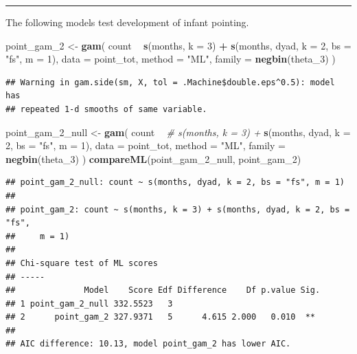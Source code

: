 \documentclass[]{article}
\newenvironment{Shaded}{\begin{snugshade}}{\end{snugshade}}
\newcommand{\CommentTok}[1]{\textcolor[rgb]{0.56,0.35,0.01}{\textit{#1}}}
\newcommand{\DataTypeTok}[1]{\textcolor[rgb]{0.13,0.29,0.53}{#1}}
\newcommand{\DecValTok}[1]{\textcolor[rgb]{0.00,0.00,0.81}{#1}}
\newcommand{\KeywordTok}[1]{\textcolor[rgb]{0.13,0.29,0.53}{\textbf{#1}}}
\newcommand{\NormalTok}[1]{#1}
\newcommand{\OperatorTok}[1]{\textcolor[rgb]{0.81,0.36,0.00}{\textbf{#1}}}
\newcommand{\StringTok}[1]{\textcolor[rgb]{0.31,0.60,0.02}{#1}}
\begin{document}
\begin{center}\rule{0.5\linewidth}{\linethickness}\end{center}

The following models test development of infant pointing.

\begin{Shaded}
\begin{Highlighting}[]
\NormalTok{point_gam_}\DecValTok{2}\NormalTok{ <-}\StringTok{ }\KeywordTok{gam}\NormalTok{(}
\NormalTok{  count }\OperatorTok{~}
\StringTok{    }\KeywordTok{s}\NormalTok{(months, }\DataTypeTok{k =} \DecValTok{3}\NormalTok{) }\OperatorTok{+}
\StringTok{    }\KeywordTok{s}\NormalTok{(months, dyad, }\DataTypeTok{k =} \DecValTok{2}\NormalTok{, }\DataTypeTok{bs =} \StringTok{"fs"}\NormalTok{, }\DataTypeTok{m =} \DecValTok{1}\NormalTok{),}
  \DataTypeTok{data =}\NormalTok{ point_tot,}
  \DataTypeTok{method =} \StringTok{"ML"}\NormalTok{,}
  \DataTypeTok{family =} \KeywordTok{negbin}\NormalTok{(theta_}\DecValTok{3}\NormalTok{)}
\NormalTok{)}
\end{Highlighting}
\end{Shaded}

\begin{verbatim}
## Warning in gam.side(sm, X, tol = .Machine$double.eps^0.5): model has
## repeated 1-d smooths of same variable.
\end{verbatim}

\begin{Shaded}
\begin{Highlighting}[]
\NormalTok{point_gam_}\DecValTok{2}\NormalTok{_null <-}\StringTok{ }\KeywordTok{gam}\NormalTok{(}
\NormalTok{  count }\OperatorTok{~}
\StringTok{    }\CommentTok{# s(months, k = 3) +}
\StringTok{    }\KeywordTok{s}\NormalTok{(months, dyad, }\DataTypeTok{k =} \DecValTok{2}\NormalTok{, }\DataTypeTok{bs =} \StringTok{"fs"}\NormalTok{, }\DataTypeTok{m =} \DecValTok{1}\NormalTok{),}
  \DataTypeTok{data =}\NormalTok{ point_tot,}
  \DataTypeTok{method =} \StringTok{"ML"}\NormalTok{,}
  \DataTypeTok{family =} \KeywordTok{negbin}\NormalTok{(theta_}\DecValTok{3}\NormalTok{)}
\NormalTok{)}
\KeywordTok{compareML}\NormalTok{(point_gam_}\DecValTok{2}\NormalTok{_null, point_gam_}\DecValTok{2}\NormalTok{)}
\end{Highlighting}
\end{Shaded}

\begin{verbatim}
## point_gam_2_null: count ~ s(months, dyad, k = 2, bs = "fs", m = 1)
## 
## point_gam_2: count ~ s(months, k = 3) + s(months, dyad, k = 2, bs = "fs", 
##     m = 1)
## 
## Chi-square test of ML scores
## -----
##              Model    Score Edf Difference    Df p.value Sig.
## 1 point_gam_2_null 332.5523   3                              
## 2      point_gam_2 327.9371   5      4.615 2.000   0.010  ** 
## 
## AIC difference: 10.13, model point_gam_2 has lower AIC.
\end{verbatim}
\end{document}
